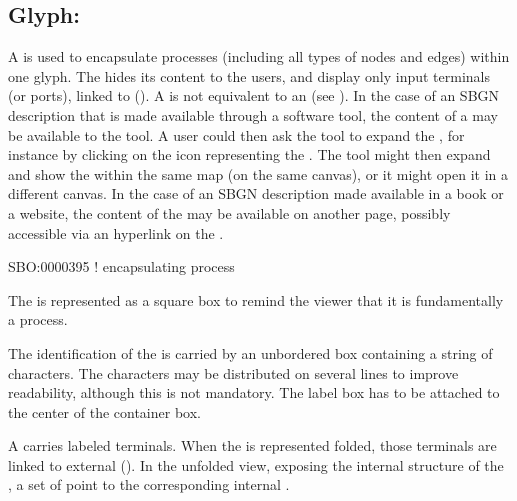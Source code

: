 
\subsection{Glyph: }
\label{sec:submap}

A  is used to encapsulate processes (including all types of nodes and edges) within one glyph.  The  hides its content to the users, and display only input terminals (or ports), linked to  (). A  is not equivalent to an  (see ).  In the case of an SBGN description that is made available through a software tool, the content of a  may be available to the tool.  A user could then ask the tool to expand the , for instance by clicking on the icon representing the .  The tool might then expand and show the  within the same map (on the same canvas), or it might open it in a different canvas. In the case of an SBGN description made available in a book or a website, the content of the  may be available on another page, possibly accessible via an hyperlink on the .

\begin{glyphDescription}

\glyphSboTerm SBO:0000395 ! encapsulating process

\glyphContainer The  is represented as a square box to remind the viewer that it is fundamentally a process.

\glyphLabel The identification of the  is carried by an unbordered box containing a string of characters.  The characters may be distributed on several lines to improve readability, although this is not mandatory.  The label box has to be attached to the center of the container box.

\glyphAux A  carries labeled terminals.  When the  is represented folded, those terminals are linked to external  ().  In the unfolded view, exposing the internal structure of the , a set of  point to the corresponding internal  .

\end{glyphDescription}


